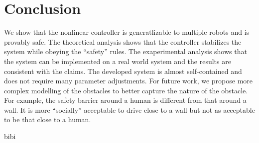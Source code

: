 \documentclass[conference]{IEEEtran}
\begin{document}
\section{Conclusion}
We show that the nonlinear controller is generatlizable to multiple robots and is provably safe. The theoretical analysis shows that the controller stabilizes the system while obeying the ``safety'' rules. The exaperimental analysis shows that the system can be implemented on a real world system and the results are consistent with the claims. The developed system is almost self-contained and does not require many parameter adjustments. 
For future work, we propose more complex modelling of the obstacles to better capture the nature of the obstacle. For example, the safety barrier around a human is different from that around a wall. It is more ``socially'' acceptable to drive close to a wall but not as acceptable to be that close to a human.


 {bibi}



\end{document}
